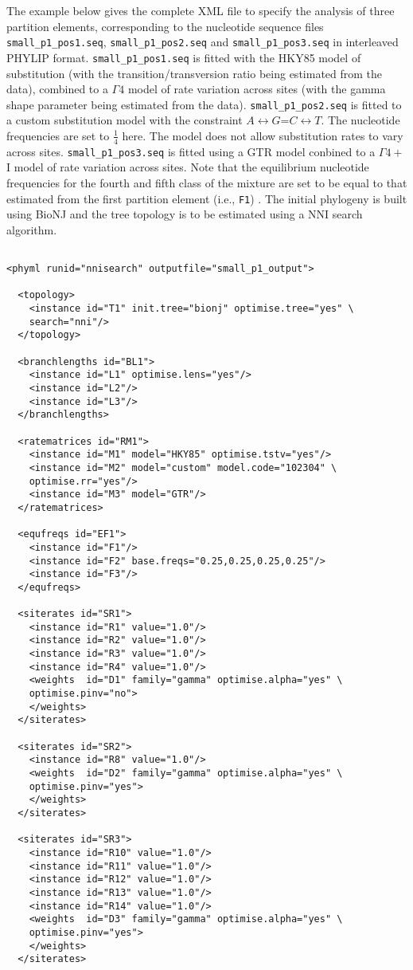 \documentclass[a4paper,12pt]{article}
\newcommand{\x}[1]{\texttt{#1}}
\begin{document}
The example below gives the complete XML file to specify the analysis of three partition elements,
corresponding to the nucleotide sequence files \x{small\_p1\_pos1.seq}, \x{small\_p1\_pos2.seq} and
\x{small\_p1\_pos3.seq} in interleaved PHYLIP format. \x{small\_p1\_pos1.seq} is fitted with the HKY85 model of substitution (with the
transition/transversion ratio being estimated from the data), combined to a $\Gamma4$ model of rate
variation across sites (with the gamma shape parameter being estimated from the data).
\x{small\_p1\_pos2.seq} is fitted to a custom substitution model with the constraint
$A\leftrightarrow G$=$C\leftrightarrow T$. The nucleotide frequencies are set to $\frac{1}{4}$ here.
The model does not allow substitution rates to vary across sites. \x{small\_p1\_pos3.seq} is fitted
using a GTR model conbined to a $\Gamma4+$I model of rate variation across sites. Note that the
equilibrium nucleotide frequencies for the fourth and fifth class of the mixture are set to be equal
to that estimated from the first partition element (i.e., \x{F1}) . The initial phylogeny is built 
using BioNJ and the tree topology is to be estimated using a NNI search algorithm.

\vspace{0.2cm}
\begin{Verbatim}[frame=single, label=Example of PhyML XML file, samepage=true, baselinestretch=0.5]

<phyml runid="nnisearch" outputfile="small_p1_output">

  <topology>
    <instance id="T1" init.tree="bionj" optimise.tree="yes" \
    search="nni"/>
  </topology>
  
  <branchlengths id="BL1">
    <instance id="L1" optimise.lens="yes"/>
    <instance id="L2"/>
    <instance id="L3"/>
  </branchlengths>

  <ratematrices id="RM1">
    <instance id="M1" model="HKY85" optimise.tstv="yes"/>
    <instance id="M2" model="custom" model.code="102304" \
    optimise.rr="yes"/>
    <instance id="M3" model="GTR"/>
  </ratematrices>
  
  <equfreqs id="EF1">
    <instance id="F1"/>
    <instance id="F2" base.freqs="0.25,0.25,0.25,0.25"/>
    <instance id="F3"/>
  </equfreqs>

  <siterates id="SR1">
    <instance id="R1" value="1.0"/>
    <instance id="R2" value="1.0"/>
    <instance id="R3" value="1.0"/>
    <instance id="R4" value="1.0"/>
    <weights  id="D1" family="gamma" optimise.alpha="yes" \
    optimise.pinv="no">
    </weights>
  </siterates>

  <siterates id="SR2">
    <instance id="R8" value="1.0"/>
    <weights  id="D2" family="gamma" optimise.alpha="yes" \
    optimise.pinv="yes">
    </weights>
  </siterates>
  
  <siterates id="SR3">
    <instance id="R10" value="1.0"/>
    <instance id="R11" value="1.0"/>
    <instance id="R12" value="1.0"/>
    <instance id="R13" value="1.0"/>
    <instance id="R14" value="1.0"/>
    <weights  id="D3" family="gamma" optimise.alpha="yes" \
    optimise.pinv="yes">
    </weights>
  </siterates>

\end{Verbatim}
\end{document}

